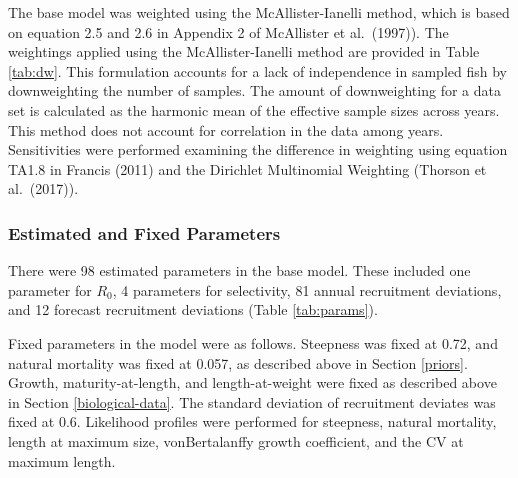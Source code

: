 \documentclass[11pt,
  english,
  a4paper,
]{article}
\begin{document}
\leavevmode\tagmcend\tagstructend\par


The base model was weighted using the McAllister-Ianelli method, which is based on equation 2.5 and 2.6 in Appendix 2 of McAllister et al.~{(1997)\leavevmode\tagmcend\tagstructend}). The weightings applied using the McAllister-Ianelli method are provided in Table \ref{tab:dw}. This formulation accounts for a lack of independence in sampled fish by downweighting the number of samples. The amount of downweighting for a data set is calculated as the harmonic mean of the effective sample sizes across years. This method does not account for correlation in the data among years. Sensitivities were performed examining the difference in weighting using equation TA1.8 in Francis {(2011)\leavevmode\tagmcend\tagstructend} and the Dirichlet Multinomial Weighting (Thorson et al.~{(2017)\leavevmode\tagmcend\tagstructend}).

\leavevmode\tagmcend\tagstructend\par


\hypertarget{estimated-and-fixed-parameters}{%
\subsubsection{Estimated and Fixed Parameters}\label{estimated-and-fixed-parameters}}

\leavevmode\tagmcend\tagstructend


There were 98 estimated parameters in the base model. These included one parameter for {\(R_0\)\leavevmode\tagmcend\tagstructend}, 4 parameters for selectivity, 81 annual recruitment deviations, and 12 forecast recruitment deviations (Table \ref{tab:params}).

\leavevmode\tagmcend\tagstructend\par


Fixed parameters in the model were as follows. Steepness was fixed at 0.72, and natural mortality was fixed at 0.057, as described above in Section \ref{priors}. Growth, maturity-at-length, and length-at-weight were fixed as described above in Section \ref{biological-data}. The standard deviation of recruitment deviates was fixed at 0.6. Likelihood profiles were performed for steepness, natural mortality, length at maximum size, vonBertalanffy growth coefficient, and the CV at maximum length.
\end{document}
